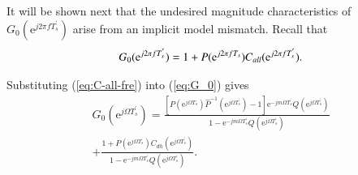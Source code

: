 \documentclass [11pt, proquest] {uwthesis}[2020/02/24]
\begin{document}
It will be shown next that the undesired magnitude characteristics
of $G_{0}(\text{e}^{j2\pi fT_{s}^{'}})$ arise from an implicit model
mismatch. Recall that
\begin{equation}
G_{0}(\text{e}^{j2\pi fT_{s}^{'}})=1+P(\text{e}^{j2\pi fT_{s}})C_{all}(\text{e}^{j2\text{\ensuremath{\pi}}fT_{s}^{'}}).\label{eq:G_0}
\end{equation}

Substituting (\ref{eq:C-all-fre}) into (\ref{eq:G_0}) gives
\begin{equation}
\begin{array}{c}
G_{0}(\text{e}^{j\Omega T_{s}^{'}})=\frac{[P(\text{e}^{j\Omega T_{s}})\hat{P}^{-1}(\text{e}^{j\Omega T_{s}^{'}})-1]\text{e}^{-jm\Omega T_{s}^{'}}Q(\text{e}^{j\Omega T_{s}^{'}})}{1-\text{e}^{-jm\Omega T_{s}^{'}}Q(\text{e}^{j\Omega T_{s}^{'}})}\\
+\frac{1+P(\text{e}^{j\Omega T_{s}})C_{dh}(\text{e}^{j\Omega T_{s}^{'}})}{1-\text{e}^{-jm\Omega T_{s}^{'}}Q(\text{e}^{j\Omega T_{s}^{'}})}.
\end{array}\label{eq:G_0-1}
\end{equation}
\end{document}
